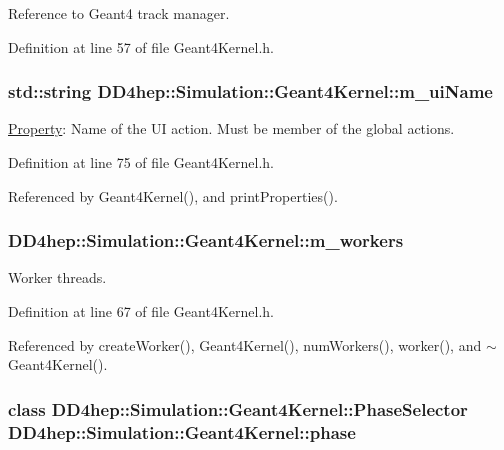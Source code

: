 Reference to Geant4 track manager. 

Definition at line 57 of file Geant4Kernel.h.\hypertarget{class_d_d4hep_1_1_simulation_1_1_geant4_kernel_aea869c039be9e0818e4f80afbab1e47c}{
\subsubsection[{m\_\-uiName}]{\setlength{\rightskip}{0pt plus 5cm}std::string {\bf DD4hep::Simulation::Geant4Kernel::m\_\-uiName}}}
\label{class_d_d4hep_1_1_simulation_1_1_geant4_kernel_aea869c039be9e0818e4f80afbab1e47c}


\hyperlink{class_d_d4hep_1_1_property}{Property}: Name of the UI action. Must be member of the global actions. 

Definition at line 75 of file Geant4Kernel.h.

Referenced by Geant4Kernel(), and printProperties().\hypertarget{class_d_d4hep_1_1_simulation_1_1_geant4_kernel_a8957db5b08d92dcd7b7c4ef63ea743b6}{
\subsubsection[{m\_\-workers}]{ {\bf DD4hep::Simulation::Geant4Kernel::m\_\-workers}}}
\label{class_d_d4hep_1_1_simulation_1_1_geant4_kernel_a8957db5b08d92dcd7b7c4ef63ea743b6}


Worker threads. 

Definition at line 67 of file Geant4Kernel.h.

Referenced by createWorker(), Geant4Kernel(), numWorkers(), worker(), and $\sim$Geant4Kernel().\hypertarget{class_d_d4hep_1_1_simulation_1_1_geant4_kernel_ae7d402daf48f3cd062f1617c5a7ee429}{
\subsubsection[{phase}]{\setlength{\rightskip}{0pt plus 5cm}class {\bf DD4hep::Simulation::Geant4Kernel::PhaseSelector}  {\bf DD4hep::Simulation::Geant4Kernel::phase}}}
\label{class_d_d4hep_1_1_simulation_1_1_geant4_kernel_ae7d402daf48f3cd062f1617c5a7ee429}


